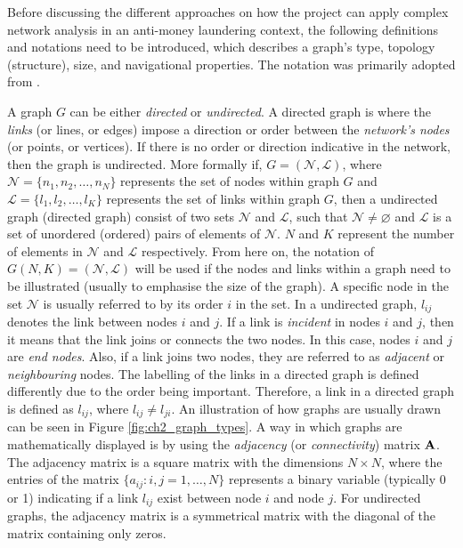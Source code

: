 Before discussing the different approaches on how the project can apply complex network analysis in an anti-money laundering context, the following definitions and notations need to be introduced, which describes a graph's type, topology (structure), size, and navigational properties. The notation was primarily adopted from  \citet{boccaletti2006complex}.

A graph $G$ can be either \textit{directed} or \textit{undirected}. A directed graph is where the \textit{links} (or lines, or edges) impose a direction or order between the \textit{network's nodes} (or points, or vertices). If there is no order or direction indicative in the network, then the graph is undirected. More formally if, $G = (\mathcal{N},\mathcal{L})$, where $\mathcal{N} = \{n_1,n_2,\ldots,n_N\}$ represents the set of nodes within graph $G$ and $\mathcal{L} = \{l_1,l_2,\ldots,l_K\}$ represents the set of links within graph $G$, then a undirected graph (directed graph) consist of two sets $\mathcal{N}$ and $\mathcal{L}$, such that $\mathcal{N} \neq \varnothing$ and $\mathcal{L}$ is a set of unordered (ordered) pairs of elements of $\mathcal{N}$. $N$ and $K$ represent the number of elements in $\mathcal{N}$ and  $\mathcal{L}$ respectively. From here on, the notation of $G(N,K) = (\mathcal{N},\mathcal{L})$ will be used if the nodes and links within a graph need to be illustrated (usually to emphasise the size of the graph). A specific node in the set $\mathcal{N}$ is usually referred to by its order $i$ in the set. In a undirected graph, $l_{ij}$ denotes the link between nodes $i$ and $j$. If a link is \textit{incident} in nodes $i$ and $j$, then it means that the link joins or connects the two nodes. In this case, nodes $i$ and $j$ are \textit{end nodes}. Also, if a link joins two nodes, they are referred to as \textit{adjacent} or \textit{neighbouring} nodes. The labelling of the links in a directed graph is defined differently due to the order being important. Therefore, a link in a directed graph is defined as $l_{ij}$,  where $l_{ij} \neq l_{ji}$. An illustration of how graphs are usually drawn can be seen in Figure \ref{fig:ch2_graph_types}. A way in which graphs are mathematically displayed is by using the \textit{adjacency} (or \textit{connectivity}) matrix $\bold{A}$. The adjacency matrix is a square matrix with the dimensions $N \times N$, where the entries of the matrix $\{a_{ij}:i,j = 1,\ldots,N\}$ represents a binary variable (typically 0 or 1) indicating if a link $l_{ij}$ exist between node $i$ and node $j$. For undirected graphs, the adjacency matrix is a symmetrical matrix with the diagonal of the matrix containing only zeros.    


